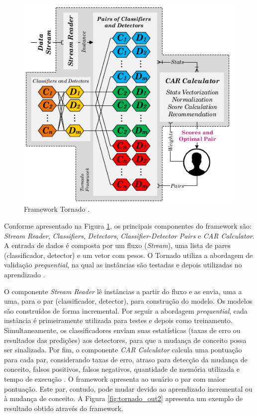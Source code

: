 \documentclass[qual, classic, a4paper]{ufbathesis}
\begin{document}
\begin{figure}[!ht]
\begin{center}
    \includegraphics[scale=0.75]{imagens/tornado.png}
    \caption{Framework Tornado \cite{Pesaranghader:Tornado}.}
    \label{fig:tornado}
\end{center}
\end{figure}

Conforme apresentado na Figura \ref{fig:tornado}, os principais componentes do framework são: 
\textit{Stream Reader}, \textit{Classifiers}, \textit{Detectors}, \textit{Classifier-Detector Pairs} e \textit{CAR Calculator}.
A entrada de dados é composta por um fluxo (\textit{Stream}), uma lista de pares (classificador, detector) e um vetor com pesos.
O Tornado utiliza a abordagem de validação \textit{prequential}, na qual as instâncias são testadas e depois utilizadas no aprendizado \cite{Gama:2014:SCD:2597757.2523813}.

O componente \textit{Stream Reader} lê instâncias a partir do fluxo e as envia, uma a uma, para o par (classificador, detector), para construção do modelo.
Os modelos são construídos de forma incremental. Por seguir a abordagem \textit{prequential}, cada instância é primeiramente utilizada para testes e depois como treinamento.
Simultaneamente, os classificadores enviam suas estatísticas (taxas de erro ou resultados das predições) aos detectores, para que a mudança de conceito possa ser sinalizada.
Por fim, o componente \textit{CAR Calculator} calcula uma pontuação para cada par, considerando taxas de erro, atraso para detecção da mudança de conceito, falsos positivos, falsos negativos, quantidade de memória utilizada e tempo de execução \cite{Pesaranghader:Tornado}.
O framework apresenta ao usuário o par com maior pontuação. Este par, contudo, pode mudar devido ao aprendizado incremental ou à mudança de conceito.
A Figura \ref{fig:tornado_out2} apresenta um exemplo de resultado obtido através do framework.
\end{document}

